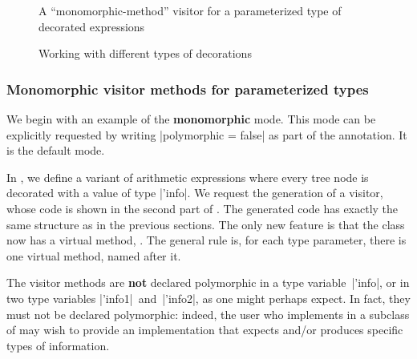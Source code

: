 \documentclass[11pt,a4paper,twoside]{article}
\renewcommand{\emph}[1]{\textbf{#1}}
\begin{document}




\begin{figure}[p]
\vspace{-\baselineskip}
\caption{A ``monomorphic-method'' visitor for a parameterized type of decorated expressions}
\label{fig:expr_info}
\end{figure}

\begin{figure}[p]
\caption{Working with different types of decorations}
\label{fig:expr_info_use}
\end{figure}

\subsubsection{Monomorphic visitor methods for parameterized types}
\label{sec:intro:parameterized:mono}

We begin with an example of the \emph{monomorphic} mode. This mode can be
explicitly requested by writing \oc|polymorphic = false| as part of the
\derivingvisitors annotation. It is the default mode.

In , we define a variant of arithmetic
expressions where every tree node is decorated with a value of type
\oc|'info|. We request the generation of a \map visitor, whose code is shown
in the second part of . The generated code has exactly the
same structure as in the previous sections. The only new feature is that the
class \map now has a virtual method, . The general rule
is, for each type parameter, there is one virtual method, named after it.

The visitor methods are \emph{not} declared polymorphic in a type
variable~\oc|'info|, or in two type variables \oc|'info1|~and~\oc|'info2|, as
one might perhaps expect. In fact, they must not be declared polymorphic:
indeed, the user who implements  in a subclass of \map may
wish to provide an implementation that expects and/or produces specific types
of information.
\end{document}
